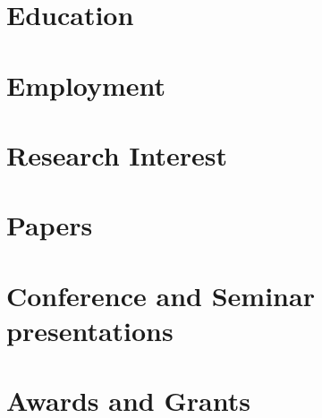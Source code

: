 \documentclass{prometheus_cv}
\begin{document}
\thispagestyle{empty}					%
\pagestyle{fancy}			 		%

\vspace*{-1cm}
\centering 


\vspace*{0.4cm}
\section{Education}


\vspace*{0.1cm}
\section{Employment}



\section{Research Interest}


\section{Papers}


\section{Conference and Seminar presentations}



\section{Awards and Grants}

\end{document}

